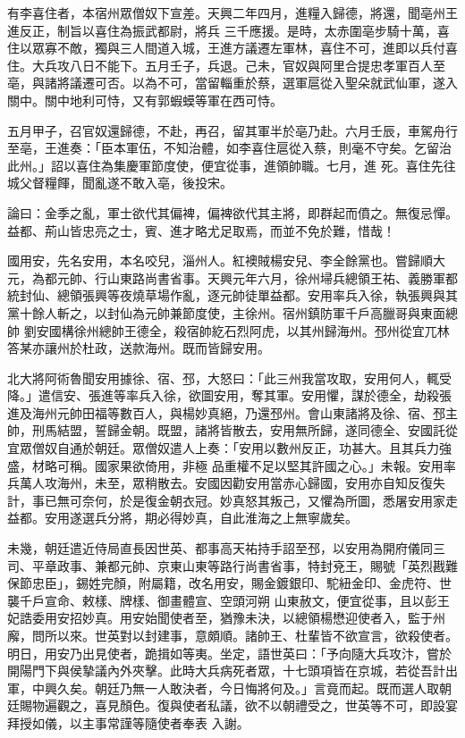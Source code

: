 \begin{pinyinscope}
 有李喜住者，本宿州眾僧奴下宣差。天興二年四月，進糧入歸德，將還，聞亳州王進反正，制旨以喜住為振武都尉，將兵
 三千應援。是時，太赤圍亳步騎十萬，喜住以眾寡不敵，獨與三人間道入城，王進方議遷左軍林，喜住不可，進即以兵付喜住。大兵攻八日不能下。五月壬子，兵退。己未，官奴與阿里合提忠孝軍百人至亳，與諸將議遷可否。以為不可，當留輜重於蔡，選軍扈從入聖朵就武仙軍，遂入關中。關中地利可恃，又有郭蝦蟆等軍在西可恃。



 五月甲子，召官奴還歸德，不赴，再召，留其軍半於亳乃赴。六月壬辰，車駕舟行至亳，王進奏：「臣本軍伍，不知治體，如李喜住扈從入蔡，則毫不守矣。乞留治此州。」詔以喜住為集慶軍節度使，便宜從事，進領帥職。七月，進
 死。喜住先往城父督糧餫，聞亂遂不敢入亳，後投宋。



 論曰：金季之亂，軍士欲代其偏裨，偏裨欲代其主將，即群起而僨之。無復忌憚。益都、荊山皆忠亮之士，賓、進才略尤足取焉，而並不免於難，惜哉！



 國用安，先名安用，本名咬兒，淄州人。紅襖賊楊安兒、李全餘黨也。嘗歸順大元，為都元帥、行山東路尚書省事。天興元年六月，徐州埽兵總領王祐、義勝軍都統封仙、總領張興等夜燒草場作亂，逐元帥徒單益都。安用率兵入徐，執張興與其黨十餘人斬之，以封仙為元帥兼節度使，主徐州。宿州鎮防軍千戶高臘哥與東面總帥
 劉安國構徐州總帥王德全，殺宿帥紇石烈阿虎，以其州歸海州。邳州從宜兀林答某亦讓州於杜政，送款海州。既而皆歸安用。



 北大將阿術魯聞安用據徐、宿、邳，大怒曰：「此三州我當攻取，安用何人，輒受降。」遣信安、張進等率兵入徐，欲圖安用，奪其軍。安用懼，謀於德全，劫殺張進及海州元帥田福等數百人，與楊妙真絕，乃還邳州。會山東諸將及徐、宿、邳主帥，刑馬結盟，誓歸金朝。既盟，諸將皆散去，安用無所歸，遂同德全、安國託從宜眾僧奴自通於朝廷。眾僧奴遣人上奏：「安用以數州反正，功甚大。且其兵力強盛，材略可稱。國家果欲倚用，非極
 品重權不足以堅其許國之心。」未報。安用率兵萬人攻海州，未至，眾稍散去。安國因勸安用當赤心歸國，安用亦自知反復失計，事已無可奈何，於是復金朝衣冠。妙真怒其叛己，又懼為所圖，悉屠安用家走益都。安用遂選兵分將，期必得妙真，自此淮海之上無寧歲矣。



 未幾，朝廷遣近侍局直長因世英、都事高天祐持手詔至邳，以安用為開府儀同三司、平章政事、兼都元帥、京東山東等路行尚書省事，特封兗王，賜號「英烈戡難保節忠臣」，錫姓完顏，附屬籍，改名用安，賜金鍍銀印、駝紐金印、金虎符、世襲千戶宣命、敕樣、牌樣、御畫體宣、空頭河朔
 山東赦文，便宜從事，且以彭王妃誥委用安招妙真。用安始聞使者至，猶豫未決，以總領楊懋迎使者入，監于州廨，問所以來。世英對以封建事，意頗順。諸帥王、杜輩皆不欲宣言，欲殺使者。明日，用安乃出見使者，跪揖如等夷。坐定，語世英曰：「予向隨大兵攻汴，嘗於開陽門下與侯摯議內外夾擊。此時大兵病死者眾，十七頭項皆在京城，若從吾計出軍，中興久矣。朝廷乃無一人敢決者，今日悔將何及。」言竟而起。既而選人取朝廷賜物遍觀之，喜見顏色。復與使者私議，欲不以朝禮受之，世英等不可，即設宴拜授如儀，以主事常謹等隨使者奉表
 入謝。




\end{pinyinscope}

